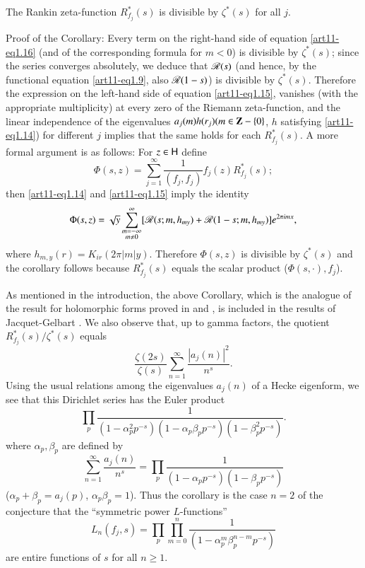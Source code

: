 \begin{coro*}
The Rankin zeta-function $R^\ast_{f_j} (s)$ is divisible by $\zeta^\ast (s)$ for all $j$.
\end{coro*}

\medskip
\noindent
Proof of the Corollary: Every term on the right-hand side of equation \eqref{art11-eq1.16} (and of the corresponding formula for $m < 0$) is divisible by $\zeta^\ast (s)$; since the series converges absolutely, we deduce that $\mathscr{R}(s)$ (and hence, by the functional equation \eqref{art11-eq1.9}, also $\mathscr{R} (1-s)$) is divisible by $\zeta^\ast (s)$. Therefore the expression on the left-hand side of equation \eqref{art11-eq1.15}, vanishes (with the appropriate multiplicity) at every zero of the Riemann zeta-function, and the linear independence of the eigenvalues $a_j(m)h(r_j) (m \in \mathbf{Z} - \{0\}$, $h$ satisfying \eqref{art11-eq1.14}) for different $j$ implies that the same holds for each $R^\ast_{f_j} (s)$. A more formal argument is as follows: For $z \in \mathsf{H}$ define 
$$
\Phi (s,z) = \sum\limits^\infty_{j=1} \frac{1}{(f_j , f_j)} f_j  (z) R^\ast_{f_j} (s);
$$
then \eqref{art11-eq1.14} and \eqref{art11-eq1.15} imply the identity
$$
\Phi (s, z) = \sqrt{y} \sum\limits^\infty_{\substack{m = - \infty\\ m \neq 0}} [\mathscr{R} (s; m, h_{my}) + \mathscr{R} (1-s; m, h_{my})] e^{2 \pi  i m x},
$$
where $h_{m,y} (r) = K_{ir} (2 \pi |m|y)$. Therefore $\Phi (s, z)$ is divisible by $\zeta^\ast(s)$ and the corollary follows because $R^\ast_{f_j} (s)$ equals the scalar product ($\Phi (s,\cdot), f_j$).

As mentioned in the introduction, the above Corollary, which is the analogue of the result for holomorphic forms proved in \cite{art11-8} and \cite{art11-10}, is included in the results of Jacquet-Gelbart \cite{art11-2}. We also observe that, up to gamma factors, the quotient $R^\ast_{f_j} (s)/ \zeta^\ast(s)$ equals 
$$
\frac{\zeta(2s)}{\zeta(s)} \sum\limits^\infty_{n=1} \frac{|a_j(n)|^2}{n^s}.
$$
Using the usual relations among the eigenvalues $a_j(n)$ of a Hecke eigenform, we see that this Dirichlet series has the Euler product
$$
\prod\limits_p \frac{1}{(1-\alpha^2_p p^{-s})(1-\alpha_p \beta_p p^{-s}) (1-\beta^2_p p^{-s})} . 
$$
where $\alpha_p, \beta_p$ are defined by
$$
\sum\limits^\infty_{n=1} \frac{a_j(n)}{n^s} = \prod\limits_p \frac{1}{(1-\alpha_p p^{-s}) (1-\beta_p p^{-s})}
$$
(\ie $\alpha_p + \beta_p = a_j (p)$, $\alpha_p \beta_p=1$). Thus the corollary is the case $n =2$ of the conjecture that the ``symmetric power $L$-functions''
$$
L_n (f_j , s) = \prod\limits_p \prod\limits^n_{m=0} \frac{1}{(1-\alpha^m_p \beta^{n-m}_p p^{-s})}
$$
are entire functions of $s$ for all $n \geqslant 1$.


